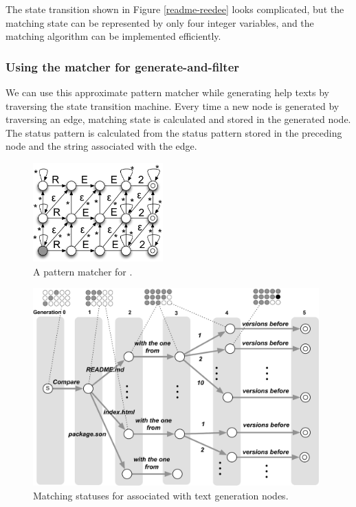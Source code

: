 \documentclass{sigchi}
\begin{document}
The state transition shown in 
Figure \ref{readme-reedee} looks complicated, but
the matching state can be represented by only four integer variables, and
the matching algorithm can be implemented efficiently.

\subsubsection{Using the matcher for generate-and-filter}

We can use this approximate pattern matcher while generating
help texts by traversing the state transition machine.
%
Every time a new node is generated by traversing an edge,
matching state is calculated and stored in the generated node.
The status pattern is calculated from the status pattern
stored in the preceding node and the string associated with the edge.

\begin{figure}[htb]
  \centerline{\includegraphics[width=50mm,bb=0 0 302 230]{figures/RE_2.pdf}}
  \caption{A pattern matcher for .}
  \label{RE_2}
\end{figure}

\begin{figure}[bth]
\centerline{\includegraphics[width=110mm,bb=0 0 643 446]{figures/gentree2.pdf}}
\caption{Matching statuses for  associated with text generation nodes.}
\label{gentree2}
\end{figure}
\end{document}
